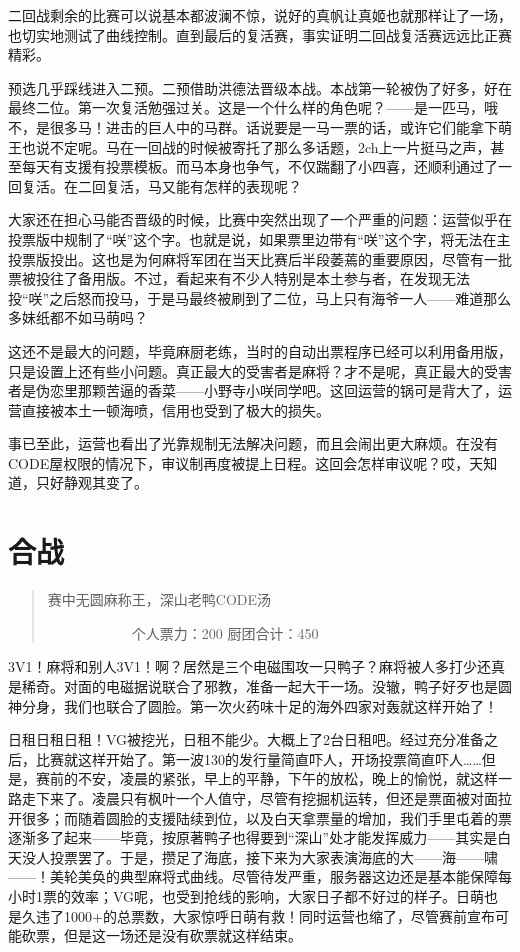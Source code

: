 二回战剩余的比赛可以说基本都波澜不惊，说好的真帆让真姬也就那样让了一场，也切实地测试了曲线控制。直到最后的复活赛，事实证明二回战复活赛远远比正赛精彩。

预选几乎踩线进入二预。二预借助洪德法晋级本战。本战第一轮被伪了好多，好在最终二位。第一次复活勉强过关。这是一个什么样的角色呢？——是一匹马，哦不，是很多马！进击的巨人中的马群。话说要是一马一票的话，或许它们能拿下萌王也说不定呢。马在一回战的时候被寄托了那么多话题，2ch上一片挺马之声，甚至每天有支援有投票模板。而马本身也争气，不仅踹翻了小四喜，还顺利通过了一回复活。在二回复活，马又能有怎样的表现呢？

大家还在担心马能否晋级的时候，比赛中突然出现了一个严重的问题：运营似乎在投票版中规制了“咲”这个字。也就是说，如果票里边带有“咲”这个字，将无法在主投票版投出。这也是为何麻将军团在当天比赛后半段萎蔫的重要原因，尽管有一批票被投往了备用版。不过，看起来有不少人特别是本土参与者，在发现无法投“咲”之后怒而投马，于是马最终被刷到了二位，马上只有海爷一人——难道那么多妹纸都不如马萌吗？

这还不是最大的问题，毕竟麻厨老练，当时的自动出票程序已经可以利用备用版，只是设置上还有些小问题。真正最大的受害者是麻将？才不是呢，真正最大的受害者是伪恋里那颗苦逼的香菜——小野寺小咲同学吧。这回运营的锅可是背大了，运营直接被本土一顿海喷，信用也受到了极大的损失。

事已至此，运营也看出了光靠规制无法解决问题，而且会闹出更大麻烦。在没有CODE屋权限的情况下，审议制再度被提上日程。这回会怎样审议呢？哎，天知道，只好静观其变了。


\section{合战}
\begin{quote}
赛中无圆麻称王，深山老鸭CODE汤

　　　　　　个人票力：200 厨团合计：450
\end{quote}

3V1！麻将和别人3V1！啊？居然是三个电磁围攻一只鸭子？麻将被人多打少还真是稀奇。对面的电磁据说联合了邪教，准备一起大干一场。没辙，鸭子好歹也是圆神分身，我们也联合了圆脸。第一次火药味十足的海外四家对轰就这样开始了！

日租日租日租！VG被挖光，日租不能少。大概上了2台日租吧。经过充分准备之后，比赛就这样开始了。第一波130的发行量简直吓人，开场投票简直吓人……但是，赛前的不安，凌晨的紧张，早上的平静，下午的放松，晚上的愉悦，就这样一路走下来了。凌晨只有枫叶一个人值守，尽管有挖掘机运转，但还是票面被对面拉开很多；而随着圆脸的支援陆续到位，以及白天拿票量的增加，我们手里屯着的票逐渐多了起来——毕竟，按原著鸭子也得要到“深山”处才能发挥威力——其实是白天没人投票罢了。于是，攒足了海底，接下来为大家表演海底的大——海——啸——！美轮美奂的典型麻将式曲线。尽管待发严重，服务器这边还是基本能保障每小时1票的效率；VG呢，也受到抢线的影响，大家日子都不好过的样子。日萌也是久违了1000+的总票数，大家惊呼日萌有救！同时运营也缩了，尽管赛前宣布可能砍票，但是这一场还是没有砍票就这样结束。

